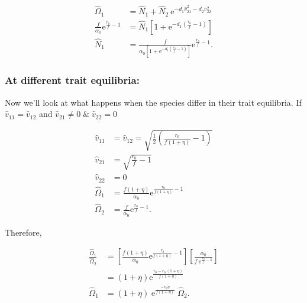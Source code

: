 \begin{equation} \label{eq:two-traits-v1-nonzero-v2-zero-N}
\begin{split}
    \hat\Omega_1 &= \hat{N}_1 + \hat{N}_2 \: \text{e}^{-d_1 \hat{v}_{21}^2 -
        d_2 v_{22}^2} \\
    \frac{f}{\alpha_0} \textrm{e}^{\frac{r_0}{f} - 1} &= \hat{N}_1 \left[
        1 + \text{e}^{- d_1 \left( \frac{ r_0 }{ f } - 1 \right) } \right] \\
    \hat{N}_1 &= \frac{ f }{ \alpha_0 \left[ 1 + \text{e}^{- d_1 \left(
        \frac{ r_0 }{ f } - 1 \right) } \right] } \text{e}^{\frac{r_0}{f} - 1}
    \text{.}
\end{split}
\end{equation}







\subsubsection*{At different trait equilibria:}




Now we'll look at what happens when the species differ in their trait equilibria.
If $\hat{v}_{11} = \hat{v}_{12}$ and $\hat{v}_{21} \ne 0 \; \& \; \hat{v}_{22} = 0$

\begin{equation*}
\begin{split}
    \hat{v}_{11} &= \hat{v}_{12} = \sqrt{\frac{1}{2}
        \left( \frac{r_0}{f (1 + \eta)} - 1 \right)} \\
    \hat{v}_{21} &= \sqrt{ \frac{ r_0 }{ f } - 1 } \\
    \hat{v}_{22} &= 0 \\
    \hat\Omega_1 &= \frac{f (1 + \eta)}{\alpha_0}
        \text{e}^{\frac{r_0}{f (1 + \eta)} - 1} \\
    \hat\Omega_2 &= \frac{f}{\alpha_0} \textrm{e}^{\frac{r_0}{f} - 1}
    \text{.}
\end{split}
\end{equation*}

Therefore,

\begin{equation*}
\begin{split}
    \frac{\hat\Omega_1}{\hat\Omega_2} &= \left[
            \frac{f (1 + \eta)}{\alpha_0}
            \text{e}^{\frac{r_0}{f (1 + \eta)} - 1}
        \right] \left[
            \frac{ \alpha_0 }{ f \; \textrm{e}^{\frac{r_0}{f} - 1} }
        \right] \\
    &= ( 1 + \eta) \text{e}^{\frac{ r_0 - r_0 \, (1 + \eta) }{f (1 + \eta)}} \\
    \hat\Omega_1 &= ( 1 + \eta) \; \text{e}^{\frac{ - r_0 \eta }{f (1 + \eta)}} \;
        \hat\Omega_2
    \text{.}
\end{split}
\end{equation*}


